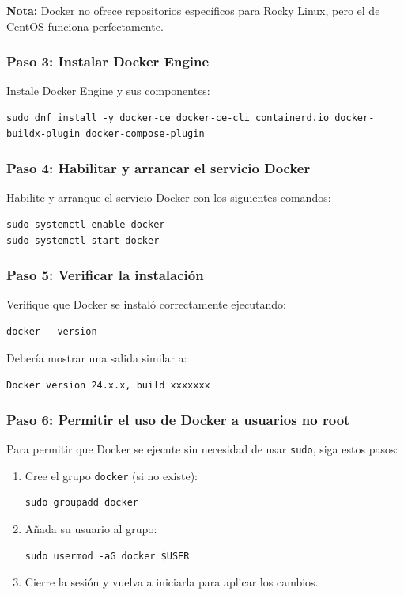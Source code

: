 \textbf{Nota:} Docker no ofrece repositorios específicos para Rocky Linux, pero el de CentOS funciona perfectamente.

\subsubsection{Paso 3: Instalar Docker Engine}

Instale Docker Engine y sus componentes:

\begin{lstlisting}[style=customstyle]
sudo dnf install -y docker-ce docker-ce-cli containerd.io docker-buildx-plugin docker-compose-plugin
\end{lstlisting}

\subsubsection{Paso 4: Habilitar y arrancar el servicio Docker}

Habilite y arranque el servicio Docker con los siguientes comandos:

\begin{lstlisting}[style=customstyle]
sudo systemctl enable docker
sudo systemctl start docker
\end{lstlisting}

\subsubsection{Paso 5: Verificar la instalación}

Verifique que Docker se instaló correctamente ejecutando:

\begin{lstlisting}[style=customstyle]
docker --version
\end{lstlisting}

Debería mostrar una salida similar a:

\texttt{Docker version 24.x.x, build xxxxxxx}

\subsubsection{Paso 6: Permitir el uso de Docker a usuarios no root}

Para permitir que Docker se ejecute sin necesidad de usar \texttt{sudo}, siga estos pasos:

\begin{enumerate}
    \item Cree el grupo \texttt{docker} (si no existe):
    \begin{lstlisting}[style=customstyle]
sudo groupadd docker
    \end{lstlisting}
    \item Añada su usuario al grupo:
    \begin{lstlisting}[style=customstyle]
sudo usermod -aG docker $USER
    \end{lstlisting}
    \item Cierre la sesión y vuelva a iniciarla para aplicar los cambios.
\end{enumerate}

